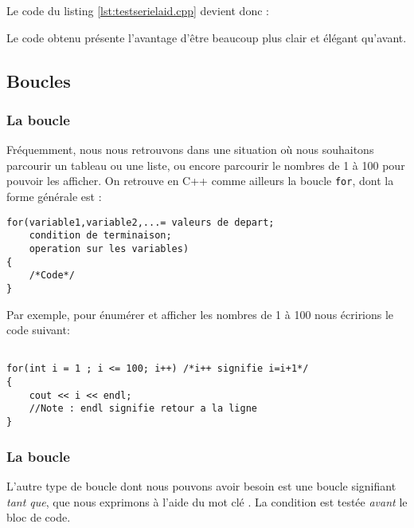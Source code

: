 Le code du listing \ref{lst:testserielaid.cpp} devient donc :\\



Le code obtenu pr\'esente l'avantage d'\^etre beaucoup plus clair et \'el\'egant qu'avant.

\subsection{Boucles}

\subsubsection{La boucle }

Fr\'equemment, nous nous retrouvons dans une situation o\`u
nous souhaitons parcourir un tableau ou une liste, ou encore parcourir le
nombres de 1 \`a 100 pour pouvoir les afficher.  On retrouve en C++ comme ailleurs la boucle \verb+for+, dont la forme g\'en\'erale est :\\

\begin{DDbox}{\linewidth}
\begin{lstlisting}[caption=Syntaxe d'une boucle \texttt{for}]
for(variable1,variable2,...= valeurs de depart;
    condition de terminaison;
    operation sur les variables)
{
    /*Code*/
}

\end{lstlisting}
\end{DDbox}

Par exemple, pour \'enum\'erer et afficher les nombres de 1 \`a 100 nous \'ecririons le code suivant:\\

\begin{DDbox}{\linewidth}
\begin{lstlisting}[caption=Exemple de boucle \texttt{for}]

for(int i = 1 ; i <= 100; i++) /*i++ signifie i=i+1*/
{
    cout << i << endl;
    //Note : endl signifie retour a la ligne
}
\end{lstlisting}
\end{DDbox}

\subsubsection{La boucle }

L'autre type de boucle dont nous pouvons avoir besoin est une boucle signifiant \textit{tant que}, que nous exprimons \`a l'aide du mot cl\'e . La condition est test\'ee \emph{avant} le bloc de code.\\

